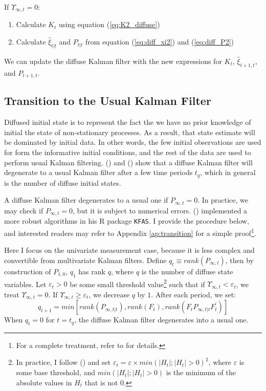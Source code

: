 \documentclass[12pt]{article}
\newenvironment{boenumerate}
    {\begin{enumerate}\renewcommand\labelenumi{\textbf\theenumi}}
    {\end{enumerate}}
\numberwithin{equation}{section}
\begin{document}
If $\Upsilon_{\infty,t}=0$:
\begin{boenumerate}
    \item Calculate $K_t$ using equation (\ref{eq:K2_diffuse})
    \item Calculate $\hat{\xi}_{t|t}$ and $P_{t|t}$ from equation (\ref{eq:diff_xi2}) and (\ref{eq:diff_P2})
\end{boenumerate}

We can update the diffuse Kalman filter with the new expressions for $K_t$, $\hat{\xi}_{t+1,t}$, and $P_{t+1,t}$.

\subsection{Transition to the Usual Kalman Filter}
Diffused initial state is to represent the fact the we have no prior knowledge of initial the state of non-stationary processes. As a result, that state estimate will be dominated by initial data. In other words, the few initial observations are used for form the informative initial conditions, and the rest of the data are used to perform usual Kalman filtering. (\cite{dejong_1991}) and (\cite{durbin_koopman_2003}) show that a diffuse Kalman filter will degenerate to a usual Kalman filter after a few time periods $t_q$, which in general is the number of diffuse initial states. 

A diffuse Kalman filter degenerates to a usual one if $P_{\infty,t}=0$. In practice, we may check if $P_{\infty,t}=0$, but it is subject to numerical errors. (\cite{helske_2016}) implemented a more robust algorithms in his R package \texttt{KFAS}. I provide the procedure below, and interested readers may refer to Appendix \ref{ap:transition} for a simple proof\footnote{For a complete treatment, refer to \cite{koopman_1997} for details.}. 

Here I focus on the univariate measurement case, because it is less complex and convertible from multivariate Kalman filters. Define $q_t\equiv rank(P_{\infty,t})$, then by construction of $P_{1,0}$, $q_1$ has rank $q$, where $q$ is the number of diffuse state variables. Let $\varepsilon_t>0$ be some small threshold value\footnote{In practice, I follow (\cite{helske_2016}) and set $\varepsilon_t=\varepsilon\times min(|H_t|;|H_t|>0)^2$,  where $\varepsilon$ is some base threshold, and $min(|H_t|;|H_t|>0)$ is the minimum of the absolute values in $H_t$ that is not $0$.} such that if $\Upsilon_{\infty,t}<\varepsilon_t$, we treat $\Upsilon_{\infty,t}=0$. If $\Upsilon_{\infty,t}\geq \varepsilon_t$, we decrease $q$ by $1$. After each period, we set: 
\[
    q_{t+1}=min[rank(P_{\infty,t|t}),rank(F_t), rank(F_tP_{\infty,t|t}F_t^{'})]
\]
When $q_{t}=0$ for $t=t_q$, the diffuse Kalman filter degenerates into a usual one. 
\end{document}
